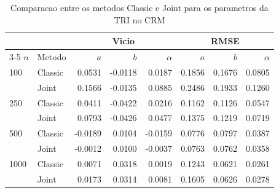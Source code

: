 \begin{table}[htbp]
\centering
\caption{Comparacao entre os metodos Classic e Joint para os parametros da TRI no CRM}
\label{tab:parametros-tri-crm}
\begin{tabular}{llrrrrrr}
\hline
 &  & \multicolumn{3}{c}{Vicio} & \multicolumn{3}{c}{RMSE} \\
\cline{3-5} \cline{6-8}
$n$ & Metodo & $a$ & $b$ & $\alpha$ & $a$ & $b$ & $\alpha$ \\
\hline
100  & Classic &  0.0531 & -0.0118 &  0.0187 & 0.1856 & 0.1676 & 0.0805 \\
     & Joint   &  0.1566 & -0.0135 &  0.0885 & 0.2486 & 0.1933 & 0.1260 \\
\hline
250  & Classic &  0.0411 & -0.0422 &  0.0216 & 0.1162 & 0.1126 & 0.0547 \\
     & Joint   &  0.0793 & -0.0426 &  0.0477 & 0.1375 & 0.1219 & 0.0719 \\
\hline
500  & Classic & -0.0189 &  0.0104 & -0.0159 & 0.0776 & 0.0797 & 0.0387 \\
     & Joint   & -0.0012 &  0.0100 & -0.0037 & 0.0763 & 0.0762 & 0.0358 \\
\hline
1000 & Classic &  0.0071 &  0.0318 &  0.0019 & 0.1243 & 0.0621 & 0.0261 \\
     & Joint   &  0.0173 &  0.0314 &  0.0081 & 0.1605 & 0.0626 & 0.0278 \\
\hline
\end{tabular}
\end{table}
